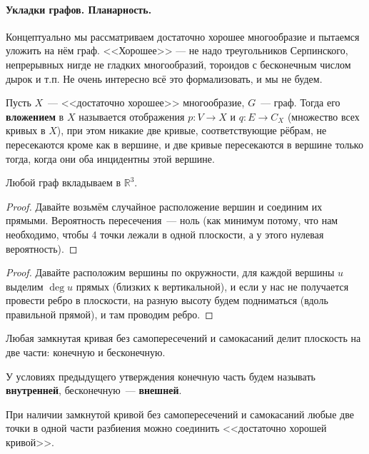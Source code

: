 \documentclass{article}
\begin{document}
    \paragraph{Укладки графов. Планарность.}
    \begin{remark}
        Концептуально мы рассматриваем достаточно хорошее многообразие и пытаемся уложить на нём граф. <<Хорошее>> — не надо треугольников Серпинского, непрерывных нигде не гладких многообразий, тороидов с бесконечным числом дырок и т.п. Не очень интересно всё это формализовать, и мы не будем.
    \end{remark}
    \begin{definition}
        Пусть $X$~--- <<достаточно хорошее>> многообразие, $G$~--- граф. Тогда его \textbf{вложением} в $X$ называется отображения $p\colon V\to X$ и $q\colon E\to C_X$ (множество всех кривых в $X$), при этом никакие две кривые, соответствующие рёбрам, не пересекаются кроме как в вершине, и две кривые пересекаются в вершине только тогда,
        когда они оба инцидентны этой вершине.
    \end{definition}
    \begin{theorem}
        Любой граф вкладываем в $\mathbb R^3$.
    \end{theorem}
    \begin{proof}
        Давайте возьмём случайное расположение вершин и соединим их прямыми. Вероятность пересечения~--- ноль (как минимум потому, что нам необходимо, чтобы 4 точки лежали в одной плоскости, а у этого нулевая вероятность).
    \end{proof}
    \begin{proof}
        Давайте расположим вершины по окружности, для каждой вершины $u$ выделим
        $\deg u$ прямых (близких к вертикальной), и если у нас не получается провести ребро в плоскости, на разную высоту будем подниматься (вдоль правильной прямой), и там проводим ребро.
    \end{proof}
    \begin{claim}
        Любая замкнутая кривая без самопересечений и самокасаний делит плоскость на две части: конечную и бесконечную.
    \end{claim}
    \begin{definition}
        У условиях предыдущего утверждения конечную часть будем называть \textbf{внутренней}, бесконечную~--- \textbf{внешней}.
    \end{definition}
    \begin{claim}
        При наличии замкнутой кривой без самопересечений и самокасаний любые две точки в одной части разбиения можно соединить <<достаточно хорошей кривой>>.
    \end{claim}
\end{document}
